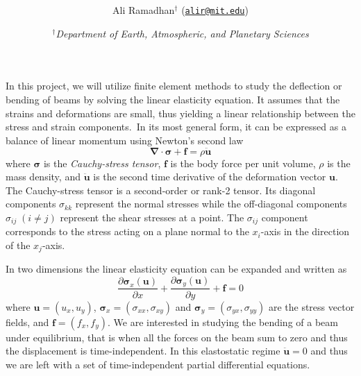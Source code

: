 \documentclass[11pt]{article}
\title{\spacedlowsmallcaps{6.339: Numerical Methods for Partial Differential Equations}\\ \spacedlowsmallcaps{Project three: Finite Element Methods}}
\author{Ali Ramadhan$^\text{†}$ (\href{mailto:alir@mit.edu}{\texttt{alir@mit.edu}})}
\date{\textit{$^\text{†}$Department of Earth, Atmospheric, and Planetary Sciences}}
\newcommand\p[2]{\frac{\partial #1}{\partial #2}}
\begin{document}
\maketitle

In this project, we will utilize finite element methods to study the deflection or bending of beams by solving the linear elasticity equation. It assumes that the strains and deformations are small, thus yielding a linear relationship between the stress and strain components.\footnotemark~In its most general form, it can be expressed as a balance of linear momentum using Newton's second law
\begin{equation*} \label{eq:linElasGen}
  \bm{\nabla\cdot\sigma + f} = \rho\ddot{\bm{u}}
\end{equation*}
where $\bm{\sigma}$ is the \emph{Cauchy-stress tensor}, $\bm{f}$ is the body force per unit volume, $\rho$ is the mass density, and $\ddot{\bm{u}}$ is the second time derivative of the deformation vector $\bm{u}$. The Cauchy-stress tensor is a second-order or rank-2 tensor. Its diagonal components $\sigma_{kk}$ represent the normal stresses while the off-diagonal components $\sigma_{ij} \; (i \ne j)$  represent the shear stresses at a point. The $\sigma_{ij}$ component corresponds to the stress acting on a plane normal to the $x_i$-axis in the direction of the $x_j$-axis.


In two dimensions the linear elasticity equation can be expanded and written as
\begin{equation} \label{eq:linElas}
  \p{\bm{\sigma}_x(\bm{u})}{x} + \p{\bm{\sigma}_y(\bm{u})}{y} + \bm{f} = 0
\end{equation}
where $\bm{u} = (u_x, u_y)$, $\bm{\sigma}_x = (\sigma_{xx}, \sigma_{xy})$ and $\bm{\sigma}_y = (\sigma_{yx}, \sigma_{yy})$ are the stress vector fields, and $\bm{f} = (f_x, f_y)$. We are interested in studying the bending of a beam under equilibrium, that is when all the forces on the beam sum to zero and thus the displacement is time-independent. In this elastostatic regime $\ddot{\bm{u}} = 0$ and thus we are left with a set of time-independent partial differential equations.
\end{document}
